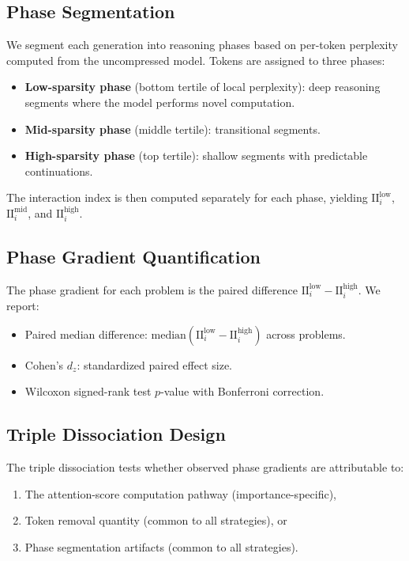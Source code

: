 \documentclass[11pt,a4paper]{article}
\begin{document}
\subsection{Phase Segmentation}

We segment each generation into reasoning phases based on per-token perplexity computed from the uncompressed model. Tokens are assigned to three phases:
\begin{itemize}
    \item \textbf{Low-sparsity phase} (bottom tertile of local perplexity): deep reasoning segments where the model performs novel computation.
    \item \textbf{Mid-sparsity phase} (middle tertile): transitional segments.
    \item \textbf{High-sparsity phase} (top tertile): shallow segments with predictable continuations.
\end{itemize}
The interaction index is then computed separately for each phase, yielding $\text{II}_{i}^{\text{low}}$, $\text{II}_{i}^{\text{mid}}$, and $\text{II}_{i}^{\text{high}}$.

\subsection{Phase Gradient Quantification}

The phase gradient for each problem is the paired difference $\text{II}_{i}^{\text{low}} - \text{II}_{i}^{\text{high}}$. We report:
\begin{itemize}
    \item Paired median difference: $\text{median}(\text{II}_{i}^{\text{low}} - \text{II}_{i}^{\text{high}})$ across problems.
    \item Cohen's $d_z$: standardized paired effect size.
    \item Wilcoxon signed-rank test $p$-value with Bonferroni correction.
\end{itemize}

\subsection{Triple Dissociation Design}

The triple dissociation tests whether observed phase gradients are attributable to:
\begin{enumerate}
    \item The attention-score computation pathway (importance-specific),
    \item Token removal quantity (common to all strategies), or
    \item Phase segmentation artifacts (common to all strategies).
\end{enumerate}
\end{document}
